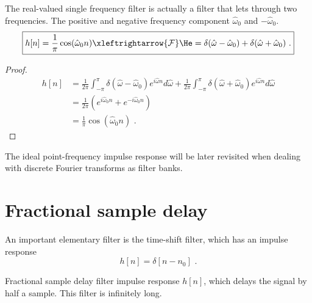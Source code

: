 The real-valued single frequency filter is actually a filter that
lets through two frequencies. The positive and negative frequency
component $\hat{\omega}_0$ and $-\hat{\omega}_0$.
\begin{equation}
  \boxed{
    h[n] = \frac{1}{\pi}\cos(\hat{\omega}_0 n)  \xleftrightarrow{\mathcal{F}}  \He = \delta(\hat{\omega}-\hat{\omega}_0) + \delta(\hat{\omega}+\hat{\omega}_0)\,\,.
    }
\end{equation}
\begin{proof}
\begin{align}
h[n]&=\frac{1}{2\pi}\int_{-\pi}^{\pi} \delta(\hat{\omega}-\hat{\omega}_0) e^{i\hat{\omega}n} d\hat{\omega} + \frac{1}{2\pi}\int_{-\pi}^{\pi} \delta(\hat{\omega}+\hat{\omega}_0) e^{i\hat{\omega}n} d\hat{\omega}\\
&= \frac{1}{2\pi} (e^{i\hat{\omega}_0 n}+e^{-i\hat{\omega}_0 n})\\
&= \frac{1}{\pi}\cos(\hat{\omega}_0 n)\,\,.
\end{align}
\end{proof}
The ideal point-frequency impulse response will be later revisited
when dealing with discrete Fourier transforms as filter banks.

\section{Fractional sample delay}
An important elementary filter is the time-shift filter, which has an impulse response
\begin{equation}
h[n] = \delta[n-n_0]\,\,.
\end{equation}
\begin{marginfigure}
\begin{center}
\end{center}
\caption{Fractional sample delay filter impulse response $h[n]$, which delays the signal by half a sample. This filter is infinitely long.}
\label{fig:frac_samp_delay_ex}
\end{marginfigure}

